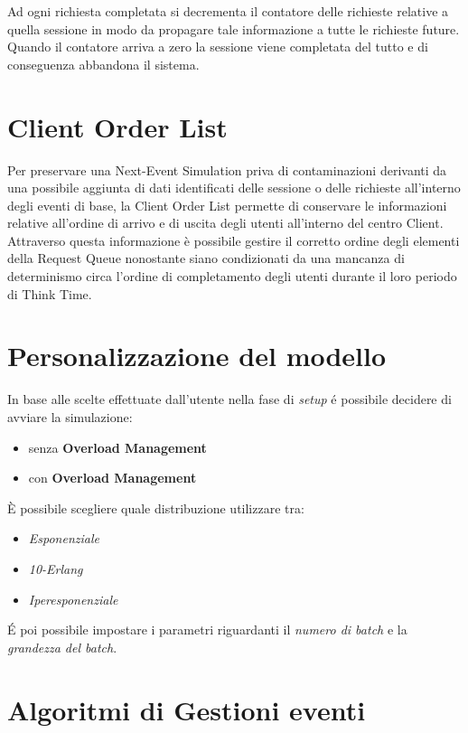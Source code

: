 Ad ogni richiesta completata si decrementa il contatore delle richieste relative 
a quella sessione in modo da propagare tale informazione a tutte le richieste 
future. Quando il contatore arriva a zero la sessione viene completata del tutto 
e di conseguenza abbandona il sistema.

\section{Client Order List}
Per preservare una Next-Event Simulation priva di contaminazioni derivanti da 
una possibile aggiunta di dati identificati delle sessione o delle richieste 
all'interno degli eventi di base, la Client Order List permette di conservare le 
informazioni relative all'ordine di arrivo e di uscita  degli utenti all'interno 
del centro Client. Attraverso questa informazione \`e possibile gestire il 
corretto ordine degli elementi della Request Queue nonostante siano condizionati 
da una mancanza di determinismo circa l'ordine di completamento degli utenti 
durante il loro periodo di Think Time.


\section{Personalizzazione del modello}
In base alle scelte effettuate dall'utente nella fase di \textit{setup} \'e 
possibile decidere di avviare la simulazione:
\begin{itemize}
\item senza \textbf{Overload Management}
\item con \textbf{Overload Management}
\end{itemize}
 
\noindent È possibile scegliere quale distribuzione utilizzare tra:
\begin{itemize}
\item \textit{Esponenziale}
\item \textit{10-Erlang}
\item \textit{Iperesponenziale}
\end{itemize}

\noindent \'E poi possibile impostare i parametri riguardanti il \textit{numero di batch}
e la \textit{grandezza del batch}.

\section{Algoritmi di Gestioni eventi}
